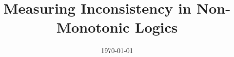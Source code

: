 \documentclass[aspectratio=169]{beamer} %
\title{Measuring Inconsistency in Non-Monotonic Logics}
\author[\myAuthorAbbr]{\myAuthor}
\institute{Artificial Intelligence Group,\\
University of Hagen, Germany}
\date{\today}
\begin{document}

\begin{frame}
    \titlepage
\end{frame}
\nologo



\appendix


\end{document}
